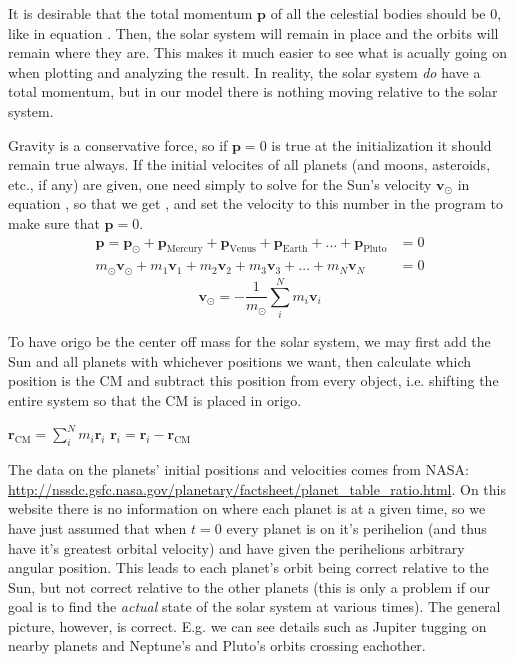 It is desirable that the total momentum $\mathbf{p}$ of all the celestial bodies should be $0$, like in equation . Then, the solar system will remain in place and the orbits will remain where they are. This makes it much easier to see what is acually going on when plotting and analyzing the result. In reality, the solar system \emph{do} have a total momentum, but in our model there is nothing moving relative to the solar system.

Gravity is a conservative force, so if $\mathbf{p} = 0$ is true at the initialization it should remain true always. If the initial velocites of all planets (and moons, asteroids, etc., if any) are given, one need simply to solve for the Sun's velocity $\mathbf{v}_\odot$ in equation , so that we get , and set the velocity to this number in the program to make sure that $\mathbf{p} = 0$.
\begin{align}
	\label{eq:momentum_sum}
	\mathbf{p} =
	\mathbf{p}_\odot
	+ \mathbf{p}_\textrm{Mercury}
	+ \mathbf{p}_\textrm{Venus}
	+ \mathbf{p}_\textrm{Earth}
	+ \dots
	+ \mathbf{p}_\textrm{Pluto}
	&= 0 \\
	\label{eq:momentum_sun}
	m_\odot \mathbf{v}_\odot
	+ m_1 \mathbf{v}_1
	+ m_2 \mathbf{v}_2
	+ m_3 \mathbf{v}_3
	+ \dots
	+ m_N \mathbf{v}_N
	&= 0
\end{align}
\begin{equation}
    \label{eq:momentum_sum2}
    \mathbf{v}_\odot = - \frac{1}{m_\odot} \sum_i^N m_i \mathbf{v}_i
\end{equation}


To have origo be the center off mass for the solar system, we may first add the Sun and all planets with whichever positions we want, then calculate which position is the CM and subtract this position from every object, i.e. shifting the entire system so that the CM is placed in origo.
\begin{algorithmic}
    \State $ \mathbf{r}_{\textrm{CM}} = \sum_i^N m_i \mathbf{r}_i $
        \State $ \mathbf{r}_i = \mathbf{r}_i - \mathbf{r}_{\textrm{CM}} $
    \EndFor
\end{algorithmic}

The data on the planets' initial positions and velocities comes from NASA: \url{http://nssdc.gsfc.nasa.gov/planetary/factsheet/planet_table_ratio.html}. On this website there is no information on where each planet is at a given time, so we have just assumed that when $t=0$ every planet is on it's perihelion (and thus have it's greatest orbital velocity) and have given the perihelions arbitrary angular position. This leads to each planet's orbit being correct relative to the Sun, but not correct relative to the other planets (this is only a problem if our goal is to find the \emph{actual} state of the solar system at various times). The general picture, however, is correct. E.g. we can see details such as Jupiter tugging on nearby planets and Neptune's and Pluto's orbits crossing eachother.
